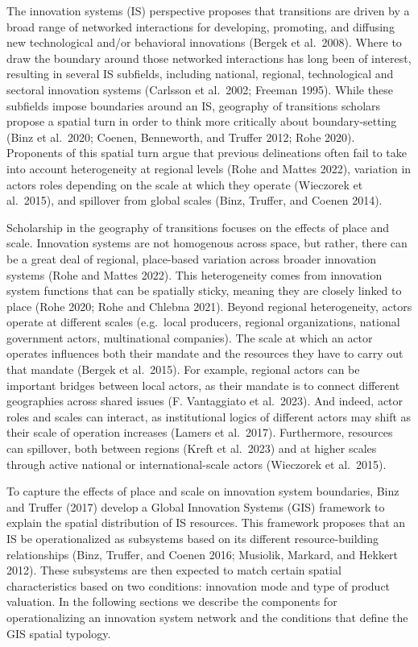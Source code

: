 \documentclass[twoside,12pt,final]{ucthesis-CA2012}
\begin{document}
\begin{ucmainmatter}
The innovation systems (IS) perspective proposes that transitions are
driven by a broad range of networked interactions for developing,
promoting, and diffusing new technological and/or behavioral innovations
(Bergek et al.~2008).
Where to draw the boundary around those networked interactions has long
been of interest, resulting in several IS subfields, including national,
regional, technological and sectoral innovation systems (Carlsson et
al.~2002; Freeman 1995).
While these subfields impose boundaries around an IS, geography of
transitions scholars propose a spatial turn in order to think more
critically about boundary-setting (Binz et al.~2020; Coenen,
Benneworth, and Truffer 2012; Rohe
2020). Proponents of this
spatial turn argue that previous delineations often fail to take into
account heterogeneity at regional levels (Rohe and Mattes
2022), variation in
actors\textquotesingle{} roles depending on the scale at which they operate (Wieczorek
et al.~2015), and spillover
from global scales (Binz, Truffer, and Coenen
2014).

Scholarship in the geography of transitions focuses on the effects of
place and scale. Innovation systems are not homogenous across space, but
rather, there can be a great deal of regional, place-based variation
across broader innovation systems (Rohe and Mattes
2022). This heterogeneity
comes from innovation system functions that can be spatially \textquotesingle sticky\textquotesingle,
meaning they are closely linked to place (Rohe 2020; Rohe and Chlebna
2021). Beyond regional
heterogeneity, actors operate at different scales (e.g.~local producers,
regional organizations, national government actors, multinational
companies). The scale at which an actor operates influences both their
mandate and the resources they have to carry out that mandate (Bergek
et al.~2015). For example,
regional actors can be important bridges between local actors, as their
mandate is to connect different geographies across shared issues (F.
Vantaggiato et al.~2023).
And indeed, actor roles and scales can interact, as institutional logics
of different actors may shift as their scale of operation increases
(Lamers et al.~2017).
Furthermore, resources can spillover, both between regions (Kreft et
al.~2023) and at higher
scales through active national or international-scale actors (Wieczorek
et al.~2015).

To capture the effects of place and scale on innovation system
boundaries, Binz and Truffer (2017) develop a \textquotesingle Global Innovation
Systems\textquotesingle{} (GIS) framework to explain the spatial distribution of IS
resources. This framework proposes that an IS be operationalized as
subsystems based on its different resource-building relationships
(Binz, Truffer, and Coenen 2016; Musiolik, Markard, and Hekkert
2012). These subsystems are
then expected to match certain spatial characteristics based on two
conditions: innovation mode and type of product valuation. In the
following sections we describe the components for operationalizing an
innovation system network and the conditions that define the GIS spatial
typology.


\end{ucmainmatter}
\end{document}
